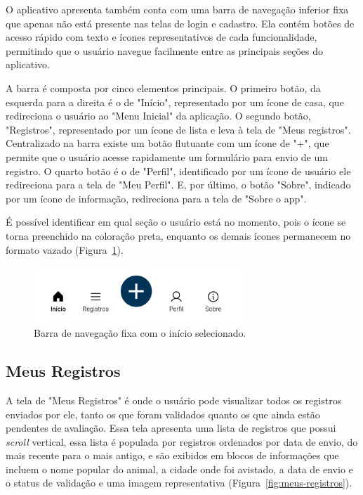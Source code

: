 O aplicativo apresenta também conta com uma barra de navegação inferior fixa que apenas não está presente 
nas telas de login e cadastro. Ela contém botões de acesso rápido com texto e ícones representativos de 
cada funcionalidade, permitindo que o usuário navegue facilmente entre as principais seções do aplicativo. 

A barra é composta por cinco elementos principais. O primeiro botão, da esquerda para a direita é o de 
"Início", representado por um ícone de casa, que redireciona o usuário ao "Menu Inicial" da aplicação. 
O segundo botão, "Registros", representado por um ícone de lista e leva à tela de "Meus registros". 
Centralizado na barra existe um botão flutuante com um ícone de "+", que permite que o usuário acesse 
rapidamente um formulário para envio de um registro. O quarto botão é o de "Perfil", identificado por um 
ícone de usuário ele redireciona para a tela de "Meu Perfil". E, por último, o botão "Sobre", indicado por 
um ícone de informação, redireciona para a tela de "Sobre o app".

É possível identificar em qual seção o usuário está no momento, pois o ícone se torna preenchido na coloração
preta, enquanto os demais ícones permanecem no formato vazado (Figura~\ref{fig:navbar}). 

\begin{figure}[H]
    \centering
    \includegraphics[width=0.7\textwidth]{imagens/sistema/device_frame/navBar.png}
    \caption{Barra de navegação fixa com o início selecionado.}
    \label{fig:navbar}
\end{figure}

\subsection{Meus Registros}
A tela de "Meus Registros" é onde o usuário pode visualizar todos os registros enviados por ele, 
tanto os que foram validados quanto os que ainda estão pendentes de avaliação.
Essa tela apresenta uma lista de registros que possui \textit{scroll} vertical, essa lista é populada por
registros ordenados por data de envio, do mais recente para o mais antigo, e são exibidos em blocos de
informações que incluem o nome popular do animal, a cidade onde foi avistado, a data de envio e o status de 
validação e uma imagem representativa (Figura~\ref{fig:meus-registros}).

